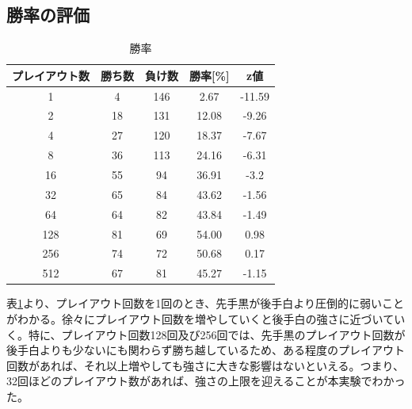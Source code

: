 \documentclass[10pt, a4paper]{jsarticle}
\begin{document}
\subsection{勝率の評価}
\begin{table}[ht]
    \begin{center}
        \begin{tabular}{c|c|c|c|c}
            プレイアウト数 & 勝ち数 & 負け数 & 勝率[\%] & z値 \\ \hline
            1 & 4 & 146 & 2.67 & -11.59 \\
            2 & 18 & 131 & 12.08 & -9.26 \\
            4 & 27 & 120 & 18.37 & -7.67 \\
            8 & 36 & 113 & 24.16 & -6.31 \\
            16 & 55 & 94 & 36.91 & -3.2 \\
            32 & 65 & 84 & 43.62 & -1.56 \\
            64 & 64 & 82 & 43.84 & -1.49 \\
            128 & 81 & 69 & 54.00 & 0.98 \\
            256 & 74 & 72 & 50.68 & 0.17 \\
            512 & 67 & 81 & 45.27 & -1.15
        \end{tabular}
        \caption{勝率}
        \label{tab:win_rate}
    \end{center}
\end{table}
\par 表\ref{tab:win_rate}より、プレイアウト回数を1回のとき、先手黒が後手白より圧倒的に弱いことがわかる。徐々にプレイアウト回数を増やしていくと後手白の強さに近づいていく。特に、プレイアウト回数128回及び256回では、先手黒のプレイアウト回数が後手白よりも少ないにも関わらず勝ち越しているため、ある程度のプレイアウト回数があれば、それ以上増やしても強さに大きな影響はないといえる。つまり、32回ほどのプレイアウト数があれば、強さの上限を迎えることが本実験でわかった。
\end{document}
